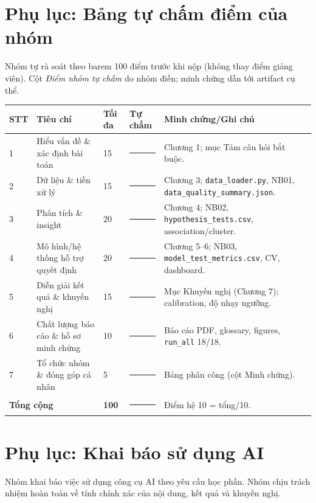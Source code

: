 \documentclass[12pt,a4paper,oneside]{report}
\newcommand{\code}[1]{\nolinkurl{#1}}
\begin{document}
\chapter{Phụ lục: Bảng tự chấm điểm của nhóm}

Nhóm tự rà soát theo barem 100 điểm trước khi nộp (không thay điểm giảng viên).
Cột \emph{Điểm nhóm tự chấm} do nhóm điền; minh chứng dẫn tới artifact cụ thể.

\begin{table}[H]
\centering
\small
\begin{tabularx}{\textwidth}{p{0.5cm}p{5.0cm}p{1.3cm}p{1.6cm}X}
\toprule
\textbf{STT} & \textbf{Tiêu chí} & \textbf{Tối đa} & \textbf{Tự chấm} &
\textbf{Minh chứng/Ghi chú}\\
\midrule
1 & Hiểu vấn đề \& xác định bài toán & 15 & \rule{1cm}{0.4pt} & Chương 1; mục Tám câu hỏi bắt buộc.\\
2 & Dữ liệu \& tiền xử lý & 15 & \rule{1cm}{0.4pt} & Chương 3; \code{data\_loader.py}, NB01, \code{data\_quality\_summary.json}.\\
3 & Phân tích \& insight & 20 & \rule{1cm}{0.4pt} & Chương 4; NB02, \code{hypothesis\_tests.csv}, association/cluster.\\
4 & Mô hình/hệ thống hỗ trợ quyết định & 20 & \rule{1cm}{0.4pt} & Chương 5--6; NB03, \code{model\_test\_metrics.csv}, CV, dashboard.\\
5 & Diễn giải kết quả \& khuyến nghị & 15 & \rule{1cm}{0.4pt} & Mục Khuyến nghị (Chương 7); calibration, độ nhạy ngưỡng.\\
6 & Chất lượng báo cáo \& hồ sơ minh chứng & 10 & \rule{1cm}{0.4pt} & Báo cáo PDF, glossary, figures, \code{run\_all} 18/18.\\
7 & Tổ chức nhóm \& đóng góp cá nhân & 5 & \rule{1cm}{0.4pt} & Bảng phân công (cột Minh chứng).\\
\midrule
\multicolumn{2}{l}{\textbf{Tổng cộng}} & \textbf{100} & \rule{1cm}{0.4pt} & Điểm hệ 10 = tổng/10.\\
\bottomrule
\end{tabularx}
\end{table}

\chapter{Phụ lục: Khai báo sử dụng AI}

Nhóm khai báo việc sử dụng công cụ AI theo yêu cầu học phần. Nhóm chịu trách
nhiệm hoàn toàn về tính chính xác của nội dung, kết quả và khuyến nghị.
\end{document}
